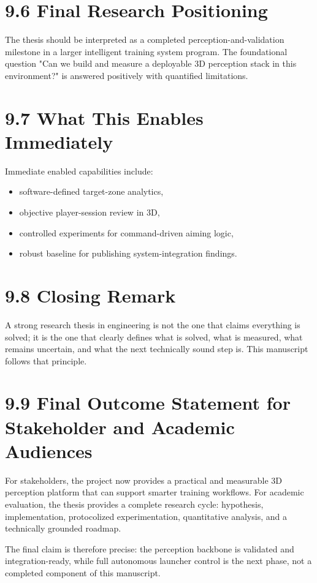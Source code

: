 \section{9.6 Final Research Positioning}
The thesis should be interpreted as a completed perception-and-validation milestone in a larger intelligent training system program. The foundational question "Can we build and measure a deployable 3D perception stack in this environment?" is answered positively with quantified limitations.

\section{9.7 What This Enables Immediately}
Immediate enabled capabilities include:
\begin{itemize}
  \item software-defined target-zone analytics,
  \item objective player-session review in 3D,
  \item controlled experiments for command-driven aiming logic,
  \item robust baseline for publishing system-integration findings.
\end{itemize}

\section{9.8 Closing Remark}
A strong research thesis in engineering is not the one that claims everything is solved; it is the one that clearly defines what is solved, what is measured, what remains uncertain, and what the next technically sound step is. This manuscript follows that principle.



\section{9.9 Final Outcome Statement for Stakeholder and Academic Audiences}
For stakeholders, the project now provides a practical and measurable 3D perception platform that can support smarter training workflows. For academic evaluation, the thesis provides a complete research cycle: hypothesis, implementation, protocolized experimentation, quantitative analysis, and a technically grounded roadmap.

The final claim is therefore precise: the perception backbone is validated and integration-ready, while full autonomous launcher control is the next phase, not a completed component of this manuscript.
